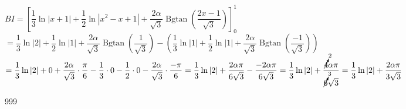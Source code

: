 \documentclass[a4paper]{article}
\newcommand{\Lh}{\left(} %
\newcommand{\Rh}{\right)}
\newcommand{\Lv}{\left[} %
\newcommand{\Rv}{\right]}
\newcommand{\Ls}{\left|} %
\newcommand{\Rs}{\right|}
\newcommand{\vervang}{\cancelto}
\begin{document}
$BI = \Lv \dfrac{1}{3} \ln \Ls x +1 \Rs + \dfrac{1}{2} \ln \Ls x^2 -x +1 \Rs + \dfrac{2\alpha}{\sqrt{3}} \operatorname{Bgtan} \Lh \dfrac{2x - 1}{\sqrt{3}} \Rh \Rv_0^1$\\

$= \dfrac{1}{3} \ln \Ls 2 \Rs + \dfrac{1}{2} \ln \Ls 1 \Rs + \dfrac{2\alpha}{\sqrt{3}} \operatorname{Bgtan} \Lh \dfrac{1}{\sqrt{3}} \Rh - \Lh \dfrac{1}{3} \ln \Ls 1 \Rs + \dfrac{1}{2} \ln \Ls 1 \Rs + \dfrac{2\alpha}{\sqrt{3}} \operatorname{Bgtan} \Lh \dfrac{-1}{\sqrt{3}} \Rh \Rh$\\

$= \dfrac{1}{3} \ln \Ls 2 \Rs +0 + \dfrac{2\alpha}{\sqrt{3}} \cdot\dfrac{\pi}{6} - \dfrac{1}{3} \cdot 0 - \dfrac{1}{2} \cdot 0 - \dfrac{2\alpha}{\sqrt{3}} \cdot \dfrac{-\pi}{6} = \dfrac{1}{3} \ln |2| + \dfrac{2\alpha\pi}{6\sqrt{3}} - \dfrac{-2\alpha\pi}{6\sqrt{3}} = \dfrac{1}{3} \ln |2| + \dfrac{\vervang{2}{4}\alpha\pi}{\vervang{3}{6}\sqrt{3}} = \dfrac{1}{3} \ln |2| + \dfrac{2\alpha\pi}{3\sqrt{3}}$\\

\begin{thebibliography}{999}
\end{thebibliography}
\end{document}
